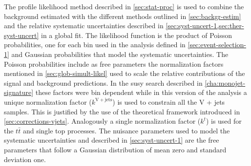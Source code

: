 The profile likelihood method described in \cref{sec:stat-proc} is used to
combine the background estimated with the different methods outlined in
\cref{sec:backgr-estim} and the relative systematic uncertainties described in
\cref{sec:syst-uncert-1,sec:ther-syst-uncert} in a global fit. The likelihood
function is the product of Poisson probabilities, one for each bin used in the
analysis defined in \cref{sec:event-selection-1} and Gaussian probabilities that
model the systematic uncertainties. The Poisson probabilities include as free
parameters the normalization factors mentioned in \cref{sec:glob-simult-likel}
used to scale the relative contributions of the signal and background
predictions. In the \gls{susy} search described in \cref{cha:monojet-signature}
these factors were bin dependent while in this version of the analysis a unique
normalization factor ($k^\mathrm{V + jets}$) is used to constrain all the V +
jets samples. This is justified by the use of the theoretical framework
introduced in \cref{sec:corrections-vjets}. Analogously a single normalization
factor ($k^t$) is used for the $t \bar{t}$ and single top processes. The
nuisance parameters used to model the systematic uncertainties and described in
\cref{sec:syst-uncert-1} are the free parameters that follow a Gaussian
distribution of mean zero and standard deviation one.

